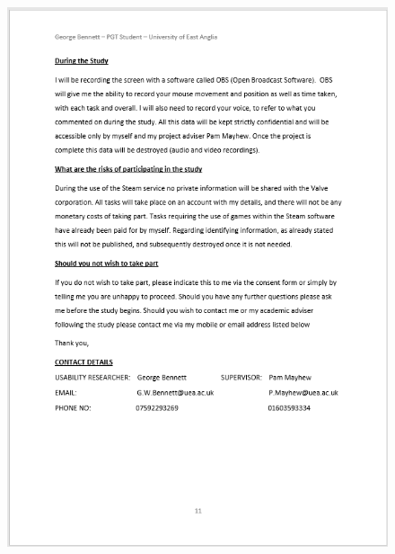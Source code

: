 \begin{figure}[H]
    \includegraphics[width=16cm,height=22cm]{Screenshots/StudyMaterialScreenshots/informationPT2.png}
\end{figure}


